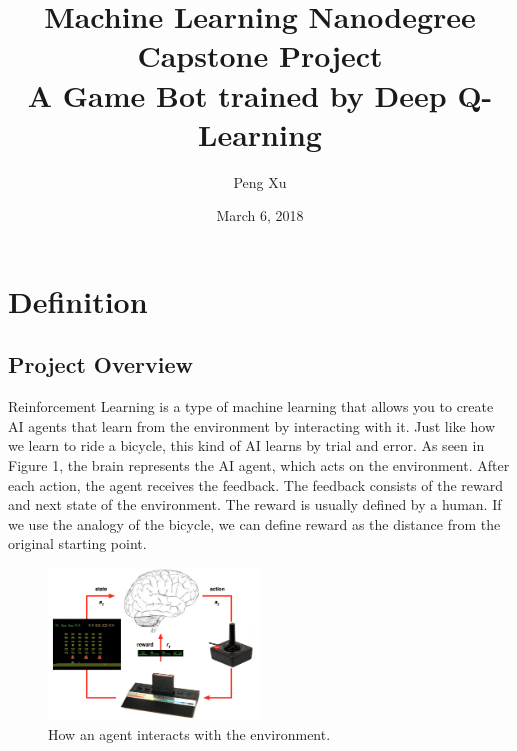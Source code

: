 \documentclass[a4paper]{article}
\begin{document}


\title{Machine Learning Nanodegree \\ Capstone Project \\ A Game Bot trained by Deep Q-Learning }
\author{Peng Xu}
\date{March 6, 2018}
\maketitle


\section{Definition}

\subsection{Project Overview}

Reinforcement Learning is a type of machine learning that allows you to create AI agents that learn from the environment by interacting with it. Just like how we learn to ride a bicycle, this kind of AI learns by trial and error. As seen in Figure 1, the brain represents the AI agent, which acts on the environment. After each action, the agent receives the feedback. The feedback consists of the reward and next state of the environment. The reward is usually defined by a human. If we use the analogy of the bicycle, we can define reward as the distance from the original starting point.

\begin{figure}[h]
\centering
\includegraphics[width=0.5\textwidth]{game-reinforcement-learning.png}
\caption{How an agent interacts with the environment.}
\end{figure}
\end{document}
